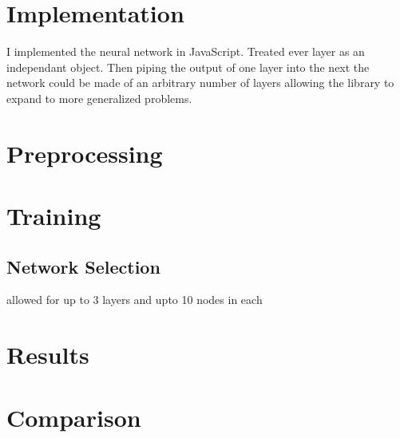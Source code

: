 \section{Implementation}

I implemented the neural network in JavaScript.
Treated ever layer as an independant object.
Then piping the output of one layer into the next the network could be made of an arbitrary number of layers allowing the library to expand to more generalized problems.

\section{Preprocessing}
\section{Training}
\subsection{Network Selection}
allowed for up to 3 layers and upto 10 nodes in each
\section{Results}
\section{Comparison}